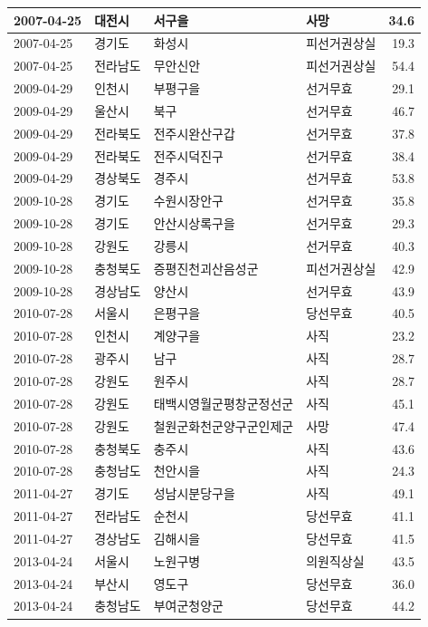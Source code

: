 \documentclass[
  11pt,
  letter]{article}
\begin{document}
\begin{longtable}[t]{l|l|l|l|r}
\hline
2007-04-25 & 대전시 & 서구을 & 사망 & 34.6\\
\hline
2007-04-25 & 경기도 & 화성시 & 피선거권상실 & 19.3\\
\hline
2007-04-25 & 전라남도 & 무안신안 & 피선거권상실 & 54.4\\
\hline
2009-04-29 & 인천시 & 부평구을 & 선거무효 & 29.1\\
\hline
2009-04-29 & 울산시 & 북구 & 선거무효 & 46.7\\
\hline
2009-04-29 & 전라북도 & 전주시완산구갑 & 선거무효 & 37.8\\
\hline
2009-04-29 & 전라북도 & 전주시덕진구 & 선거무효 & 38.4\\
\hline
2009-04-29 & 경상북도 & 경주시 & 선거무효 & 53.8\\
\hline
2009-10-28 & 경기도 & 수원시장안구 & 선거무효 & 35.8\\
\hline
2009-10-28 & 경기도 & 안산시상록구을 & 선거무효 & 29.3\\
\hline
2009-10-28 & 강원도 & 강릉시 & 선거무효 & 40.3\\
\hline
2009-10-28 & 충청북도 & 증평진천괴산음성군 & 피선거권상실 & 42.9\\
\hline
2009-10-28 & 경상남도 & 양산시 & 선거무효 & 43.9\\
\hline
2010-07-28 & 서울시 & 은평구을 & 당선무효 & 40.5\\
\hline
2010-07-28 & 인천시 & 계양구을 & 사직 & 23.2\\
\hline
2010-07-28 & 광주시 & 남구 & 사직 & 28.7\\
\hline
2010-07-28 & 강원도 & 원주시 & 사직 & 28.7\\
\hline
2010-07-28 & 강원도 & 태백시영월군평창군정선군 & 사직 & 45.1\\
\hline
2010-07-28 & 강원도 & 철원군화천군양구군인제군 & 사망 & 47.4\\
\hline
2010-07-28 & 충청북도 & 충주시 & 사직 & 43.6\\
\hline
2010-07-28 & 충청남도 & 천안시을 & 사직 & 24.3\\
\hline
2011-04-27 & 경기도 & 성남시분당구을 & 사직 & 49.1\\
\hline
2011-04-27 & 전라남도 & 순천시 & 당선무효 & 41.1\\
\hline
2011-04-27 & 경상남도 & 김해시을 & 당선무효 & 41.5\\
\hline
2013-04-24 & 서울시 & 노원구병 & 의원직상실 & 43.5\\
\hline
2013-04-24 & 부산시 & 영도구 & 당선무효 & 36.0\\
\hline
2013-04-24 & 충청남도 & 부여군청양군 & 당선무효 & 44.2\\

\end{longtable}
\end{document}
